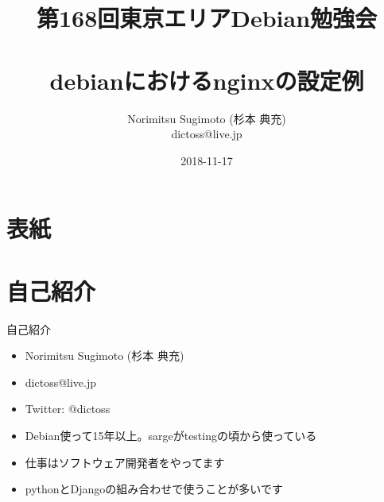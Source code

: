 \title{第168回東京エリアDebian勉強会 \\　\\debianにおけるnginxの設定例}
\subtitle{}
\author{Norimitsu Sugimoto (杉本 典充) \\dictoss@live.jp}
\date{2018-11-17}



\section{表紙}

\begin{frame}
  \titlepage{}
\end{frame}


\section{自己紹介}

\begin{frame}{自己紹介}
  \begin{itemize}
  \item Norimitsu Sugimoto (杉本 典充)
  \item dictoss@live.jp
  \item Twitter: @dictoss
  \item Debian使って15年以上。sargeがtestingの頃から使っている
  \item 仕事はソフトウェア開発者をやってます
  \item pythonとDjangoの組み合わせで使うことが多いです
  \end{itemize}
\end{frame}



